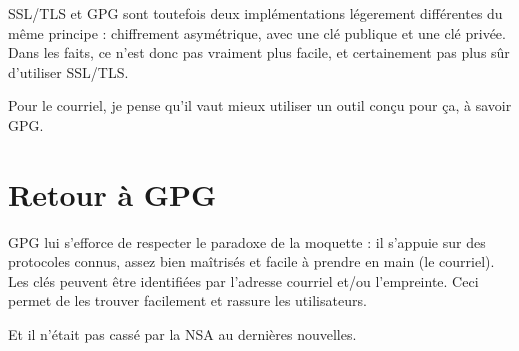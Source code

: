 SSL/TLS et GPG sont toutefois deux implémentations légerement différentes du même principe : chiffrement asymétrique, avec une clé
publique et une clé privée. Dans les faits, ce n'est donc pas vraiment plus facile, et certainement pas plus sûr d'utiliser SSL/TLS.

Pour le courriel, je pense qu'il vaut mieux utiliser un outil conçu pour ça, à savoir GPG.

\section{Retour à GPG}\label{retour-uxe0-gpg}

GPG lui s'efforce de respecter le paradoxe de la moquette : il s'appuie sur des protocoles connus, assez bien maîtrisés et facile à prendre en
main (le courriel). Les clés peuvent être identifiées par l'adresse
courriel et/ou l'empreinte. Ceci permet de les trouver facilement et rassure les utilisateurs.

Et il n'était pas cassé par la NSA au dernières nouvelles.